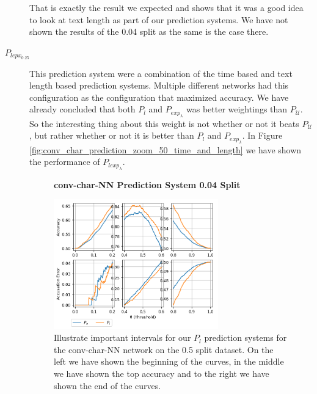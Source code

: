 \begin{description}
        That is exactly the result we expected and shows that it was a good idea
        to look at text length as part of our prediction systems. We have not
        shown the results of the 0.04 split as the same is the case there.

    \item[$P_{lepx_{0.25}}$]

        This prediction system were a combination of the time based and text
        length based prediction systems. Multiple different networks had this
        configuration as the configuration that maximized accuracy. We have
        already concluded that both $P_l$ and $P_{exp_\lambda}$ was better
        weightings than $P_\mathcal{U}$. So the interesting thing about this
        weight is not whether or not it beats $P_\mathcal{U}$, but rather
        whether or not it is better than $P_l$ and $P_{exp_\lambda}$. In Figure
        \ref{fig:conv_char_prediction_zoom_50_time_and_length} we have shown the
        performance of $P_{lexp_\lambda}$.

        \begin{figure}
            \centering
            \textbf{\glsdesc{conv-char-NN} Prediction System 0.04 Split}\par\medskip
            \includegraphics[width=0.7\textwidth]{./pictures/discussion/conv_char_nn_prediction_zoom_50_text_length.png}
            \caption{Illustrate important intervals for our $P_l$ prediction
                systems for the \gls{conv-char-NN} network on the 0.5 split
                dataset. On the left we have shown the beginning of the curves,
                in the middle we have shown the top accuracy and to the right we
                have shown the end of the curves.}
            \label{fig:conv_char_prediction_zoom_50_text_length}
        \end{figure}


\end{description}
